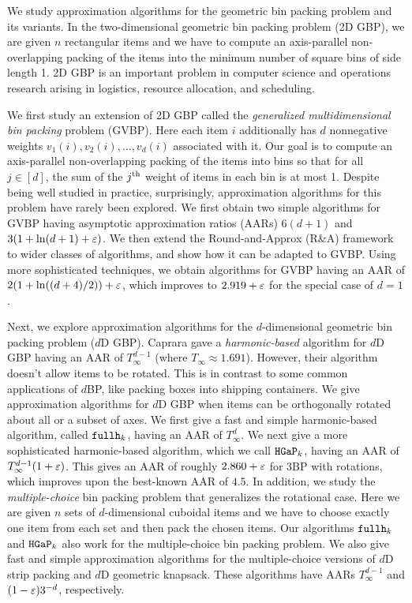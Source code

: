 We study approximation algorithms for
the geometric bin packing problem and its variants.
In the two-dimensional geometric bin packing problem (2D GBP),
we are given $n$ rectangular items and we have to compute
an axis-parallel non-overlapping packing
of the items into the minimum number of square bins of side length 1.
2D GBP is an important problem in computer science and operations research
arising in logistics, resource allocation, and scheduling.

We first study an extension of 2D GBP called the
\emph{generalized multidimensional bin packing} problem (GVBP).
Here each item $i$ additionally has $d$ nonnegative weights
$v_1(i), v_2(i), \ldots, v_d(i)$ associated with it.
Our goal is to compute an axis-parallel non-overlapping packing of the items into bins so that
for all $j \in [d]$, the sum of the $j^{\textrm{th}}$ weight of items in each bin is at most 1.
Despite being well studied in practice, surprisingly,
approximation algorithms for this problem have rarely been explored.
We first obtain two simple algorithms for GVBP having asymptotic approximation ratios (AARs)
$6(d+1)$ and $3(1 + \ln(d+1) + \varepsilon)$.
We then extend the Round-and-Approx (R\&A) framework
\texorpdfstring{\cite{bansal2014binpacking}}{[Bansal-Khan, SODA'14]}
to wider classes of algorithms, and show how it can be adapted to GVBP.
Using more sophisticated techniques, we obtain algorithms for GVBP having
an AAR of $2(1+\ln((d+4)/2))+\varepsilon$,
which improves to $2.919+\varepsilon$ for the special case of $d=1$.

Next, we explore approximation algorithms for the $d$-dimensional
geometric bin packing problem ($d$D GBP).
Caprara \texorpdfstring{\cite{caprara2008}}{(MOR 2008)}
gave a \emph{harmonic-based} algorithm for $d$D GBP having an AAR of
\texorpdfstring{$T_{\infty}^{d-1}$ (where $T_{\infty} \approx 1.691$)}{1.69104^(d-1)}.
However, their algorithm doesn't allow items to be rotated.
This is in contrast to some common applications of $d$BP,
like packing boxes into shipping containers.
We give approximation algorithms for $d$D GBP when items can be
orthogonally rotated about all or a subset of axes.
We first give a fast and simple harmonic-based algorithm,
called \texorpdfstring{$\operatorname{\mathtt{fullh}}_{k}$}{fullh\_k}, having an AAR of
\texorpdfstring{$T_{\infty}^{d}$}{1.69104^d}.
We next give a more sophisticated harmonic-based algorithm,
which we call \texorpdfstring{$\operatorname{\mathtt{HGaP}}_{k}$}{hgap\_k},
having an AAR of \texorpdfstring{$T_{\infty}^{d-1}(1+\varepsilon)$}{(1+eps)1.69104^(d-1)}.
This gives an AAR of roughly $2.860 + \varepsilon$ for 3BP with rotations,
which improves upon the best-known AAR of $4.5$.
In addition, we study the \emph{multiple-choice} bin packing problem
that generalizes the rotational case.
Here we are given $n$ sets of $d$-dimensional cuboidal items and we have to
choose exactly one item from each set and then pack the chosen items.
Our algorithms \texorpdfstring{$\operatorname{\mathtt{fullh}}_{k}$}{fullh\_k} and \texorpdfstring{$\operatorname{\mathtt{HGaP}}_{k}$}{hgap\_k}
also work for the multiple-choice bin packing problem.
We also give fast and simple approximation algorithms for the multiple-choice
versions of $d$D strip packing and $d$D geometric knapsack.
These algorithms have AARs
\texorpdfstring{$T_{\infty}^{d-1}$}{1.69104^(d-1)} and $(1-\varepsilon)3^{-d}$, respectively.

